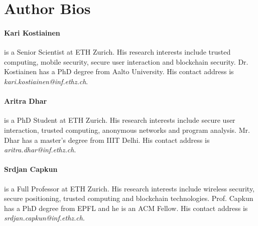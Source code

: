 \documentclass[letterpaper,twocolumn,10pt]{article}
\begin{document}
\section*{Author Bios}


\paragraph{Kari Kostiainen} is a Senior Scientist at ETH Zurich. His research interests include trusted computing, mobile security, secure user interaction and blockchain security. Dr. Kostiainen has a PhD degree from Aalto University. His contact address is \emph{kari.kostiainen@inf.ethz.ch}.

\vspace{5pt}
\paragraph{Aritra Dhar} is a PhD Student at ETH Zurich. His research interests include secure user interaction, trusted computing, anonymous networks and program analysis. Mr. Dhar has a master's degree from IIIT Delhi. His contact address is \emph{aritra.dhar@inf.ethz.ch}.

\vspace{5pt}
\paragraph{Srdjan Capkun} is a Full Professor at ETH Zurich. His research interests include wireless security, secure positioning, trusted computing and blockchain technologies. Prof. Capkun has a PhD degree from EPFL and he is an ACM Fellow. His contact address is \emph{srdjan.capkun@inf.ethz.ch}.

\end{document}
